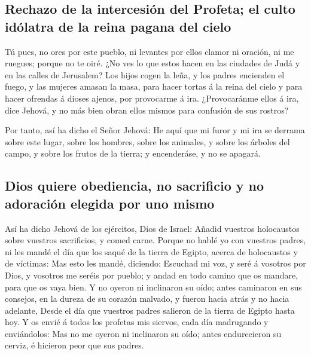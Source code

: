 \hypertarget{rechazo-de-la-intercesiuxf3n-del-profeta-el-culto-iduxf3latra-de-la-reina-pagana-del-cielo}{%
\subsection{Rechazo de la intercesión del Profeta; el culto idólatra de
la reina pagana del
cielo}\label{rechazo-de-la-intercesiuxf3n-del-profeta-el-culto-iduxf3latra-de-la-reina-pagana-del-cielo}}

 Tú pues, no ores por este pueblo, ni levantes por ellos
clamor ni oración, ni me ruegues; porque no te oiré.  ¿No
ves lo que estos hacen en las ciudades de Judá y en las calles de
Jerusalem?  Los hijos cogen la leña, y los padres encienden
el fuego, y las mujeres amasan la masa, para hacer tortas á la reina del
cielo y para hacer ofrendas á dioses ajenos, por provocarme á ira.
 ¿Provocaránme ellos á ira, dice Jehová, y no más bien
obran ellos mismos para confusión de sus rostros?

 Por tanto, así ha dicho el Señor Jehová: He aquí que mi
furor y mi ira se derrama sobre este lugar, sobre los hombres, sobre los
animales, y sobre los árboles del campo, y sobre los frutos de la
tierra; y encenderáse, y no se apagará.

\hypertarget{dios-quiere-obediencia-no-sacrificio-y-no-adoraciuxf3n-elegida-por-uno-mismo}{%
\subsection{Dios quiere obediencia, no sacrificio y no adoración elegida
por uno
mismo}\label{dios-quiere-obediencia-no-sacrificio-y-no-adoraciuxf3n-elegida-por-uno-mismo}}

 Así ha dicho Jehová de los ejércitos, Dios de Israel:
Añadid vuestros holocaustos sobre vuestros sacrificios, y comed carne.
 Porque no hablé yo con vuestros padres, ni les mandé el
día que los saqué de la tierra de Egipto, acerca de holocaustos y de
víctimas:  Mas esto les mandé, diciendo: Escuchad mi voz, y
seré á vosotros por Dios, y vosotros me seréis por pueblo; y andad en
todo camino que os mandare, para que os vaya bien.  Y no
oyeron ni inclinaron su oído; antes caminaron en sus consejos, en la
dureza de su corazón malvado, y fueron hacia atrás y no hacia adelante,
 Desde el día que vuestros padres salieron de la tierra de
Egipto hasta hoy. Y os envié á todos los profetas mis siervos, cada día
madrugando y enviándolos:  Mas no me oyeron ni inclinaron
su oído; antes endurecieron su cerviz, é hicieron peor que sus padres.


